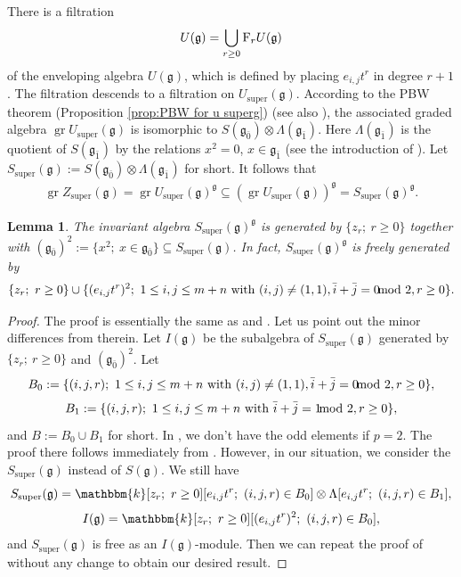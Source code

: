 \documentclass[12pt,reqno]{amsart}
\newcommand{\fg}{\mathfrak{g}}
\newcommand{\kk}{\mathbbm{k}}
\DeclareMathOperator{\super}{super}
\DeclareMathOperator{\gr}{gr}
\numberwithin{equation}{section}
\newtheorem{Lemma}[Theorem]{Lemma}
\theoremstyle{Theorem}
\theoremstyle{remark}
\numberwithin{equation}{section}
\begin{document}
There is a filtration 
\[
 U(\fg)=\bigcup\limits_{r\geq 0}{\rm F}_r U(\fg)
\]
of the enveloping algebra $U(\fg)$, 
which is defined by placing $e_{i,j}t^r$ in degree $r+1$.
The filtration descends to a filtration on $U_{\super}(\fg)$.
According to the PBW theorem (Proposition \ref{prop:PBW for u superg}) (see also \cite[Theorem 3.2]{EH25}), 
the associated graded algebra $\gr U_{\super}(\fg)$ is isomorphic to $S(\fg_{\bar 0})\otimes \Lambda (\fg_{\bar 1})$.
Here $\Lambda(\fg_{\bar 1})$ is the quotient of $S(\fg_{\bar 1})$ by the relations $x^2=0$, $x\in\fg_{\bar 1}$ (see the introduction of \cite{EH25}).
Let $S_{\super}(\fg):=S(\fg_{\bar 0})\otimes \Lambda (\fg_{\bar 1})$ for short. It follows that 
\begin{align}\label{grzsuper shuyu Ssuper gg}
\gr Z_{\super}(\fg)=\gr U_{\super}(\fg)^{\fg}\subseteq (\gr U_{\super}(\fg))^\fg=S_{\super}(\fg)^{\fg}.
\end{align}
\begin{Lemma}\label{Lem: invariant subalgebra S super gg}
The invariant algebra $S_{\super}(\fg)^\fg$ is generated by $\{z_r;~r\geq 0\}$ together with $(\fg_{\bar 0})^2:=\{x^2;~x\in\fg_{\bar 0}\}\subseteq S_{\super}(\fg)$.
In fact,
$S_{\super}(\fg)^\fg$ is freely generated by
\begin{align}\label{free generators of ssuper gg}
\{z_r;~r\geq 0\}\cup \{(e_{i,j}t^r)^2;~1\leq i, j\leq m+n~{\rm with}~(i,j)\neq (1,1), \bar i+\bar j=0\!\!\!\!\! \mod 2, r\geq 0\}.
\end{align}
\end{Lemma}
\begin{proof}
The proof is essentially the same as \cite[Lemma 2.1]{CH23} and \cite[Lemma 3.2]{BT18}. Let us point out the minor differences from therein.
Let $I(\fg)$ be the subalgebra of $S_{\super}(\fg)$ generated by $\{z_r;~r\geq 0\}$ and $(\fg_{\bar 0})^2$.
Let
\[
B_0:=\{(i,j,r);~1\leq i, j\leq m+n~{\rm with}~(i,j)\neq (1,1), \bar i+\bar j=0\!\!\!\!\! \mod 2, r\geq 0\},
\]
\[
B_1:=\{(i,j,r);~1\leq i, j\leq m+n~{\rm with}~\bar i+\bar j=1\!\!\!\!\! \mod 2, r\geq 0\},
\]
and $B:=B_0\cup B_1$ for short.
In \cite[Lemma 2.1]{CH23}, we don't have the odd elements if $p=2$.
The proof there follows immediately from \cite[Lemma 3.2]{BT18}.
However, in our situation, we consider the $S_{\super}(\fg)$ instead of $S(\fg)$.
We still have
\[
S_{\super}(\fg)=\kk[z_r;~r\geq 0][e_{i,j}t^r;~(i,j,r)\in B_0]\otimes \Lambda[e_{i,j}t^r;~(i,j,r)\in B_1],
\]
\[
I(\fg)=\kk[z_r;~r\geq 0][(e_{i,j}t^r)^2;~(i,j,r)\in B_0], 
\]
and $S_{\super}(\fg)$ is free as an $I(\fg)$-module.
Then we can repeat the proof of \cite[Lemma 2.1]{CH23}
without any change to obtain our desired result.
\end{proof}
\end{document}

